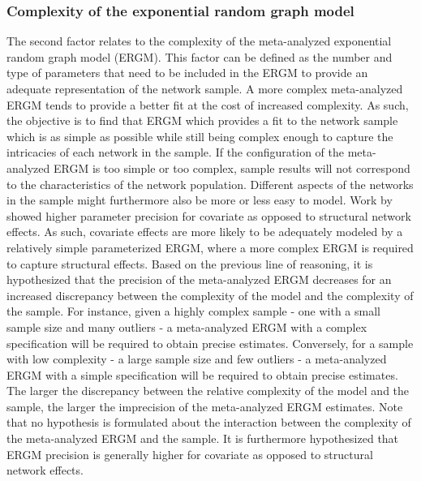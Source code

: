 \documentclass[a4paper, man, floatsintext]{apa6}
\begin{document}
\subsubsection{Complexity of the exponential random graph model} The second factor relates to the complexity of the meta-analyzed exponential random graph model (ERGM). This factor can be defined as the number and type of parameters that need to be included in the ERGM to provide an adequate representation of the network sample. A more complex meta-analyzed ERGM tends to provide a better fit at the cost of increased complexity. As such, the objective is to find that ERGM which provides a fit to the network sample which is as simple as possible while still being complex enough to capture the intricacies of each network in the sample.  \clearpage \noindent If the configuration of the meta-analyzed ERGM is too simple or too complex, sample results will not correspond to the characteristics of the network population. Different aspects of the networks in the sample might furthermore also be more or less easy to model. Work by  showed higher parameter precision for covariate as opposed to structural network effects. As such, covariate effects are more likely to be adequately modeled by a relatively simple parameterized ERGM, where a more complex ERGM is required to capture structural effects. Based on the previous line of reasoning, it is hypothesized that the precision of the meta-analyzed ERGM decreases for an increased discrepancy between the complexity of the model and the complexity of the sample. For instance, given a highly complex sample - one with a small sample size and many outliers - a meta-analyzed ERGM with a complex specification will be required to obtain precise estimates. Conversely, for a sample with low complexity - a large sample size and few outliers - a meta-analyzed ERGM with a simple specification will be required to obtain precise estimates. The larger the discrepancy between the relative complexity of the model and the sample, the larger the imprecision of the meta-analyzed ERGM estimates. Note that no hypothesis is formulated about the interaction between the complexity of the meta-analyzed ERGM and the sample. It is furthermore hypothesized that ERGM precision is generally higher for covariate as opposed to structural network effects. 
\end{document}
